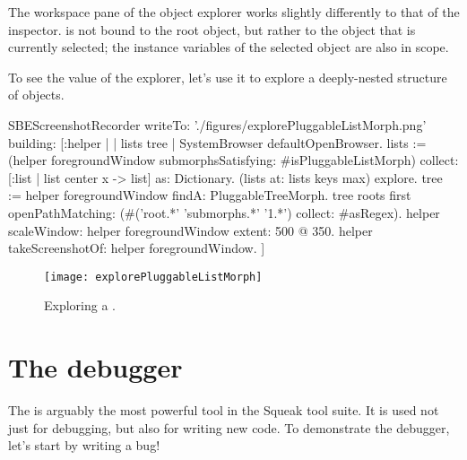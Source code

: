 \documentclass[a4paper,10pt,twoside]{book}
\begin{document}
The workspace pane of the object explorer works slightly differently to that of the inspector.
 is not bound to the root object, but rather to the object that is currently selected; the instance variables of the selected object are also in scope.

To see the value of the explorer, let's use it to explore a deeply-nested structure of objects.


\begin{ExecuteSmalltalkScript}
SBEScreenshotRecorder writeTo: './figures/explorePluggableListMorph.png' building: [:helper |
	| lists tree |
	SystemBrowser defaultOpenBrowser.
	lists := (helper foregroundWindow submorphsSatisfying: #isPluggableListMorph)
		collect: [:list | list center x -> list] as: Dictionary.
	(lists at: lists keys max) explore.
	tree := helper foregroundWindow findA: PluggableTreeMorph.
	tree roots first openPathMatching: (#('root.*' 'submorphs.*' '1.*') collect: #asRegex).
	helper scaleWindow: helper foregroundWindow extent: 500 @ 350.
	helper takeScreenshotOf: helper foregroundWindow.
]
\end{ExecuteSmalltalkScript}
\begin{figure}[tbp]
	\begin{center}
		\texttt{[image: explorePluggableListMorph]}
	\end{center}
	\caption{Exploring a .}
	\label{fig:explorePluggableListMorph}
\end{figure}

\section{The debugger}
\label{sec:debugger} %

The  is arguably the most powerful tool in the Squeak tool suite.
It is used not just for debugging, but also for writing new code.
To demonstrate the debugger, let's start by writing a bug!
\end{document}
